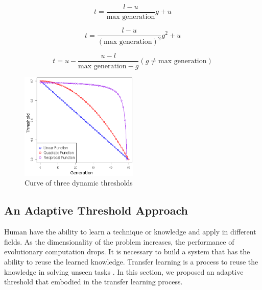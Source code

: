 \begin{equation}
\label{eq:linear}
 t = \frac{l - u}{\text{max generation}} g + u
\end{equation}

\begin{equation}
\label{eq:quadratic}
 t = \frac{l - u}{(\text{max generation})^2} g^2 + u
\end{equation}

\begin{equation}
\label{eq:reciprocal}
 t = u - \frac{u - l}{\text{max generation} - g}  (g \neq \text{max generation})
\end{equation}


% 
% 
\begin{figure}[H]
\centering
  \includegraphics[width=0.5\textwidth]{pics/dynamic.png}
  \caption{Curve of three dynamic thresholds}
  \label{fig:dynamic}
\end{figure}
% 
\subsection{An Adaptive Threshold Approach}
\label{sec:transfer}
Human have the ability to learn a technique or knowledge and apply in different fields. 
As the dimensionality of the problem increases, the performance of evolutionary computation drops. 
It is necessary to build a system that has the ability to reuse the learned knowledge. 
Transfer learning is a process to reuse the knowledge in solving unseen tasks \cite{olivas}. 
In this section, we proposed an adaptive threshold that embodied in the transfer learning process.

